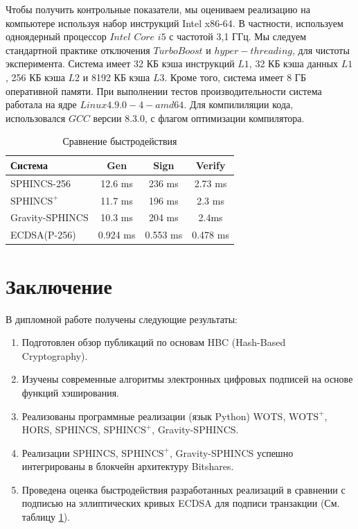 \documentclass[a4paper, 14pt]{extarticle}
\begin{document}
Чтобы получить контрольные показатели, мы оцениваем реализацию на компьютере используя набор инструкций Intel x86-64. В частности, используем одноядерный процессор $Intel$ $Core$ $i5$ с частотой 3,1 ГГц. Мы следуем стандартной практике отключения $TurboBoost$ и $hyper-threading$, для чистоты эксперимента. Система имеет 32 КБ кэша инструкций $L1$, 32 КБ кэша данных $L1$, 256 КБ кэша $L2$ и 8192 КБ кэша $L3$. Кроме того, система имеет 8 ГБ оперативной памяти. При выполнении тестов производительности система работала на ядре $Linux 4.9.0-4-amd64$. Для компилиляции кода, использовался $GCC$ версии 8.3.0, с флагом оптимизации компилятора.
\newline

\begin{table}[h!]
    \begin{center}
      \caption{Сравнение быстродействия}
      \label{tab:table1}
      \begin{tabular}{l|c|c|c}
        \textbf{Система} & \textbf{Gen} & \textbf{Sign} & \textbf{Verify}\\
        \hline
        SPHINCS-256 & 12.6 ms & 236 ms & 2.73 ms\\
        $\text{SPHINCS}^+$ & 11.7 ms & 196 ms & 2.3 ms\\
        Gravity-SPHINCS & 10.3 ms & 204 ms & 2.4ms\\
        ECDSA(P-256) & 0.924 ms & 0.553 ms & 0.478 ms\\
      \end{tabular}
    \end{center}
  \end{table}
\newpage

\section{Заключение}
В дипломной работе получены следующие результаты:
\begin{enumerate}
    \item Подготовлен обзор публикаций по основам HBC (Hash-Based\\ Cryptography).
    \item Изучены современные алгоритмы электронных цифровых подписей на основе функций хэширования.
    \item Реализованы программные реализации (язык Python) WOTS, $\text{WOTS}^+$, HORS, SPHINCS, $\text{SPHINCS}^+$, Gravity-SPHINCS.
    \item Реализации SPHINCS, $\text{SPHINCS}^+$, Gravity-SPHINCS успешно интегрированы в блокчейн архитектуру Bitshares.
    \item Проведена оценка быстродействия разработанных реализаций в сравнении с подписью на эллиптических кривых ECDSA для подписи транзакции (См. таблицу \ref{tab:table1}).
\end{enumerate}
\end{document}
